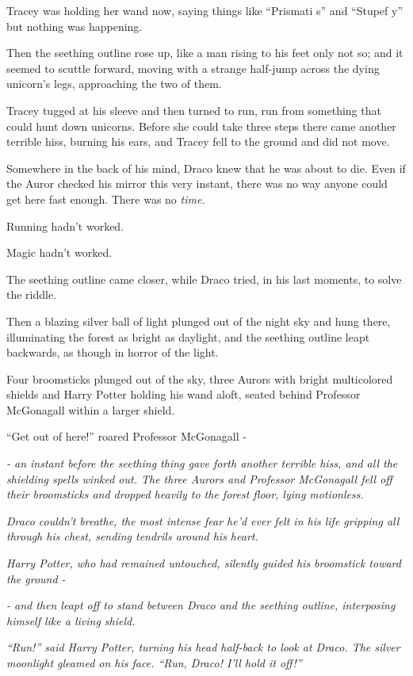 Tracey was holding her wand now, saying things like ``Prismati s'' and ``Stupef y'' but nothing was happening.

Then the seething outline rose up, like a man rising to his feet only not so; and it seemed to scuttle forward, moving with a strange half-jump across the dying unicorn's legs, approaching the two of them.

Tracey tugged at his sleeve and then turned to run, run from something that could hunt down unicorns. Before she could take three steps there came another terrible hiss, burning his ears, and Tracey fell to the ground and did not move.

Somewhere in the back of his mind, Draco knew that he was about to die. Even if the Auror checked his mirror this very instant, there was no way anyone could get here fast enough. There was no \emph{time.}

Running hadn't worked.

Magic hadn't worked.

The seething outline came closer, while Draco tried, in his last moments, to solve the riddle.

Then a blazing silver ball of light plunged out of the night sky and hung there, illuminating the forest as bright as daylight, and the seething outline leapt backwards, as though in horror of the light.

Four broomsticks plunged out of the sky, three Aurors with bright multicolored shields and Harry Potter holding his wand aloft, seated behind Professor McGonagall within a larger shield.

``Get out of here!'' roared Professor McGonagall -

\emph{- an instant before the seething thing gave forth another terrible hiss, and all the shielding spells winked out. The three Aurors and Professor McGonagall fell off their broomsticks and dropped heavily to the forest floor, lying motionless.}

\emph{Draco couldn't breathe, the most intense fear he'd ever felt in his life gripping all through his chest, sending tendrils around his heart.}

\emph{Harry Potter, who had remained untouched, silently guided his broomstick toward the ground -}

\emph{- and then leapt off to stand between Draco and the seething outline, interposing himself like a living shield.}

\emph{``Run!'' said Harry Potter, turning his head half-back to look at Draco. The silver moonlight gleamed on his face. ``Run, Draco! I'll hold it off!''}

